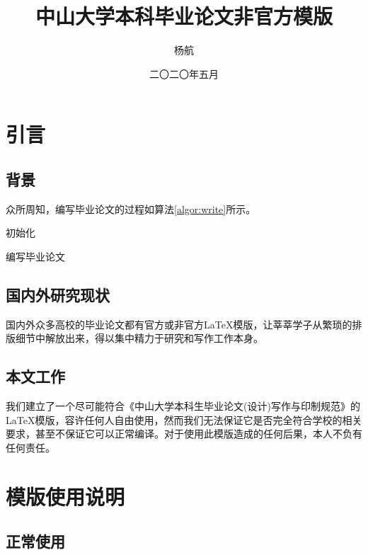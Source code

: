 \documentclass{sysuthesis}
\title{中山大学本科毕业论文非官方模版}%
\author{杨航}%
\date{二〇二〇年五月}%
\begin{document}
\frontmatter

\cleardoublepage
\tableofcontents%
\cleardoublepage
\listoftables%
\cleardoublepage
\listoffigures%
\cleardoublepage
\listofalgorithms%

\mainmatter



\chapter{引言}

\section{背景}

 众所周知，编写毕业论文的过程如算法\ref{algor:write}所示。

\begin{algorithm}[H]
初始化\;
\caption{编写毕业论文}
\label{algor:write}
\end{algorithm}

\section{国内外研究现状}

国内外众多高校的毕业论文都有官方或非官方\LaTeX 模版，让莘莘学子从繁琐的排版细节中解放出来，得以集中精力于研究和写作工作本身。 

\section{本文工作}

我们建立了一个尽可能符合《中山大学本科生毕业论文(设计)写作与印制规范》的\LaTeX 模版，容许任何人自由使用，然而我们无法保证它是否完全符合学校的相关要求，甚至不保证它可以正常编译。对于使用此模版造成的任何后果，本人不负有任何责任。

\chapter{模版使用说明}

\section{正常使用}
\end{document}
